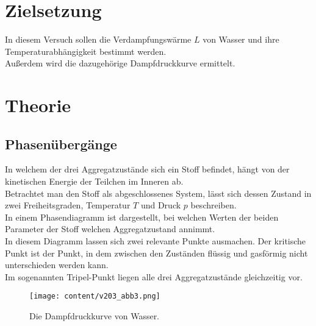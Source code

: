 \section{Zielsetzung}
\label{sec:Zielsetzung}
In diesem Versuch sollen die Verdampfungswärme $L$ von Wasser und ihre Temperaturabhängigkeit bestimmt werden.\\
Außerdem wird die dazugehörige Dampfdruckkurve ermittelt.\\


\section{Theorie}
\label{sec:Theorie}

\subsection{Phasenübergänge}
\label{subsec:Phasenuebergaenge}
In welchem der drei Aggregatzustände sich ein Stoff befindet, hängt von 
der kinetischen Energie der Teilchen im Inneren ab. \\
Betrachtet man den Stoff als abgeschlossenes System, lässt sich dessen Zustand in zwei
Freiheitsgraden, Temperatur $T$ und Druck $p$ beschreiben. \\
In einem Phasendiagramm ist dargestellt, bei welchen Werten der beiden Parameter der Stoff welchen
Aggregatzustand annimmt. \\
In diesem Diagramm lassen sich zwei relevante Punkte ausmachen. Der kritische Punkt ist der Punkt, in dem zwischen den Zuständen 
flüssig und gasförmig nicht unterschieden werden kann. \\
Im sogenannten Tripel-Punkt liegen alle drei Aggregatzustände gleichzeitig vor. \\

\begin{figure}[H]
    \centering
    \texttt{[image: content/v203\_abb3.png]}
    \caption{Die Dampfdruckkurve von Wasser. \cite{sample}}
    \label{abb:dampfkurve}
\end{figure}


